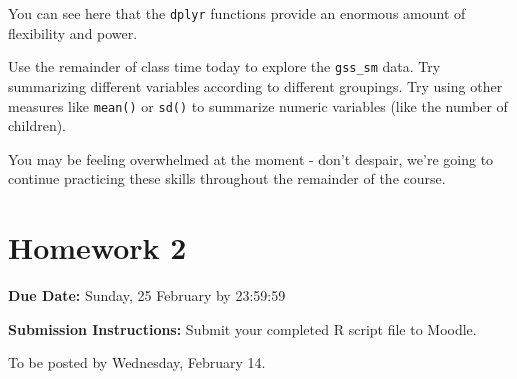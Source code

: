 \documentclass[
]{book}
\begin{document}
You can see here that the \texttt{dplyr} functions provide an enormous amount of flexibility and power.

Use the remainder of class time today to explore the \texttt{gss\_sm} data. Try summarizing different variables according to different groupings. Try using other measures like \texttt{mean()} or \texttt{sd()} to summarize numeric variables (like the number of children).

You may be feeling overwhelmed at the moment - don't despair, we're going to continue practicing these skills throughout the remainder of the course.

\hypertarget{homework-2}{%
\chapter*{Homework 2}\label{homework-2}}

\textbf{Due Date:} Sunday, 25 February by 23:59:59

\textbf{Submission Instructions:} Submit your completed R script file to Moodle.

To be posted by Wednesday, February 14.

  
\end{document}
